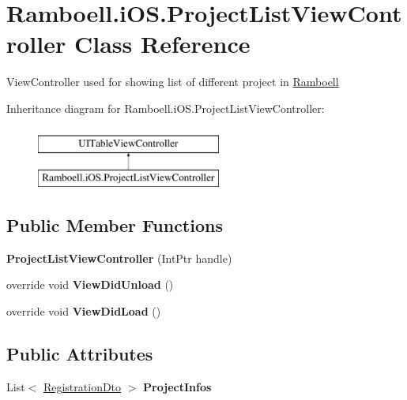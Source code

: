 \hypertarget{class_ramboell_1_1i_o_s_1_1_project_list_view_controller}{}\section{Ramboell.\+i\+O\+S.\+Project\+List\+View\+Controller Class Reference}
\label{class_ramboell_1_1i_o_s_1_1_project_list_view_controller}


View\+Controller used for showing list of different project in \hyperlink{namespace_ramboell}{Ramboell}  


Inheritance diagram for Ramboell.\+i\+O\+S.\+Project\+List\+View\+Controller\+:\begin{figure}[H]
\begin{center}
\leavevmode
\includegraphics[height=2.000000cm]{class_ramboell_1_1i_o_s_1_1_project_list_view_controller}
\end{center}
\end{figure}
\subsection*{Public Member Functions}
\begin{DoxyCompactItemize}
\item 
\mbox{\label{class_ramboell_1_1i_o_s_1_1_project_list_view_controller_af11dbb2ef75ff0c212db5eb3e83221f1}} 
{\bfseries Project\+List\+View\+Controller} (Int\+Ptr handle)
\item 
\mbox{\label{class_ramboell_1_1i_o_s_1_1_project_list_view_controller_a5c7c55c88d9791e012eee872c4932b1a}} 
override void {\bfseries View\+Did\+Unload} ()
\item 
\mbox{\label{class_ramboell_1_1i_o_s_1_1_project_list_view_controller_a10bb2d9313173756397337ac4f4a0da1}} 
override void {\bfseries View\+Did\+Load} ()
\end{DoxyCompactItemize}
\subsection*{Public Attributes}
\begin{DoxyCompactItemize}
\item 
\mbox{\label{class_ramboell_1_1i_o_s_1_1_project_list_view_controller_abb2511c3c29ee55bb6562e30893fc917}} 
List$<$ \hyperlink{class_ramboell_1_1i_o_s_1_1_registration_dto}{Registration\+Dto} $>$ {\bfseries Project\+Infos}
\end{DoxyCompactItemize}
